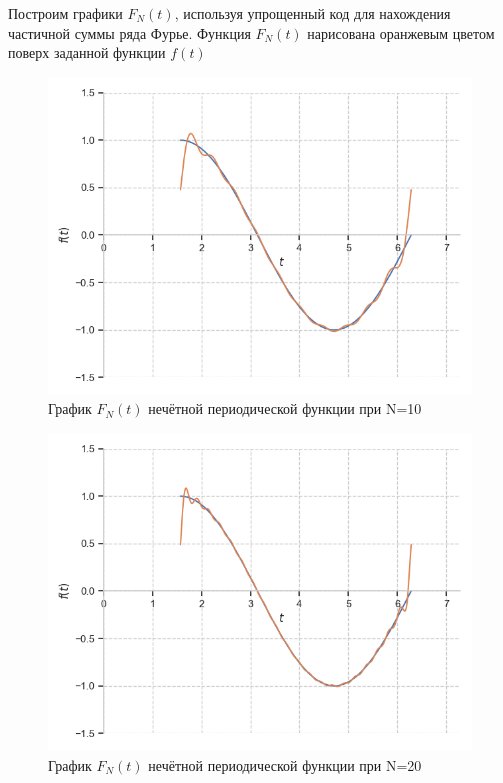\documentclass[a4paper, 16pt]{article}
\begin{document}
\noindent Построим графики $F_N(t)$, используя упрощенный код для нахождения частичной суммы ряда Фурье.
Функция $F_N(t)$ нарисована оранжевым цветом поверх заданной функции $f(t)$


\begin{figure}[!htb]
    \centering
    \includegraphics[scale=0.8]{fur_sin_n=10.png}
    \captionsetup{skip=0pt}
    \caption{График $F_N(t)$ нечётной периодической функции при N=10}
    \label{Рис:24}
\end{figure}
\newpage
\vspace*{10mm}
\begin{figure}[!htb]
    \centering
    \includegraphics[scale=0.8]{fur_sin_n=20.png}
    \captionsetup{skip=0pt}
    \caption{График $F_N(t)$ нечётной периодической функции при N=20}
    \label{Рис:25}
\end{figure}
\end{document}
